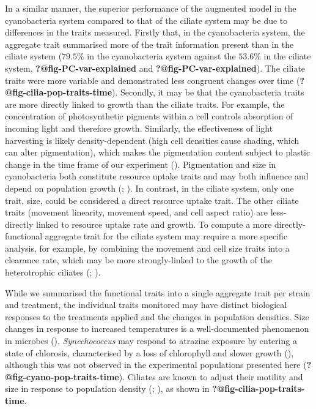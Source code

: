 \documentclass[
  letterpaper,
  DIV=11,
  numbers=noendperiod]{scrartcl}
\begin{document}
In a similar manner, the superior performance of the augmented model in
the cyanobacteria system compared to that of the ciliate system may be
due to differences in the traits measured. Firstly that, in the
cyanobacteria system, the aggregate trait summarised more of the trait
information present than in the ciliate system (\(79.5\%\) in the
cyanobacteria system against the \(53.6\%\) in the ciliate system,
\textbf{?@fig-PC-var-explained} and \textbf{?@fig-PC-var-explained}).
The ciliate traits were more variable and demonstrated less congruent
changes over time (\textbf{?@fig-cilia-pop-traits-time}). Secondly, it
may be that the cyanobacteria traits are more directly linked to growth
than the ciliate traits. For example, the concentration of
photosynthetic pigments within a cell controls absorption of incoming
light and therefore growth. Similarly, the effectiveness of light
harvesting is likely density-dependent (high cell densities cause
shading, which can alter pigmentation), which makes the pigmentation
content subject to plastic change in the time frame of our experiment
(). Pigmentation and size in
cyanobacteria both constitute resource uptake traits and may both
influence and depend on population growth
(;
). In contrast, in the
ciliate system, only one trait, size, could be considered a direct
resource uptake trait. The other ciliate traits (movement linearity,
movement speed, and cell aspect ratio) are less-directly linked to
resource uptake rate and growth. To compute a more directly-functional
aggregate trait for the ciliate system may require a more specific
analysis, for example, by combining the movement and cell size traits
into a clearance rate, which may be more strongly-linked to the growth
of the heterotrophic ciliates (; ).

While we summarised the functional traits into a single aggregate trait
per strain and treatment, the individual traits monitored may have
distinct biological responses to the treatments applied and the changes
in population densities. Size changes in response to increased
temperatures is a well-documented phenomenon in microbes
(). \emph{Synechococcus}
may respond to atrazine exposure by entering a state of chlorosis,
characterised by a loss of chlorophyll and slower growth
(),
although this was not observed in the experimental populations presented
here (\textbf{?@fig-cyano-pop-traits-time}). Ciliates are known to
adjust their motility and size in response to population density
(;
), as shown in
\textbf{?@fig-cilia-pop-traits-time}.
\end{document}
